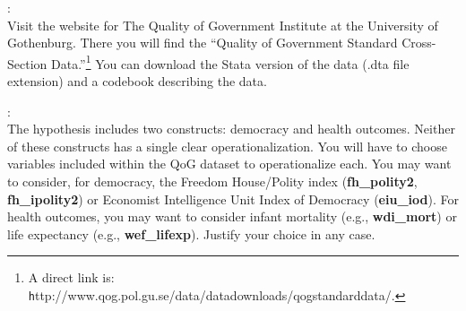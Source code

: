 \documentclass[a4paper,11pt]{article}
\begin{document}
:\\
Visit the website for The Quality of Government Institute at the University of Gothenburg. There you will find the ``Quality of Government Standard Cross-Section Data.''\footnote{A direct link is: {\texttt http://www.qog.pol.gu.se/data/datadownloads/qogstandarddata/}.} You can download the Stata version of the data (.dta file extension) and a codebook describing the data.

\vspace{1em}

:\\
The hypothesis includes two constructs: democracy and health outcomes. Neither of these constructs has a single clear operationalization. You will have to choose variables included within the QoG dataset to operationalize each. You may want to consider, for democracy, the Freedom House/Polity index ({\bfseries fh\_polity2}, {\bfseries fh\_ipolity2}) or Economist Intelligence Unit Index of Democracy ({\bfseries eiu\_iod}). For health outcomes, you may want to consider infant mortality (e.g., {\bfseries wdi\_mort}) or life expectancy (e.g., {\bfseries wef\_lifexp}). Justify your choice in any case.
\end{document}
